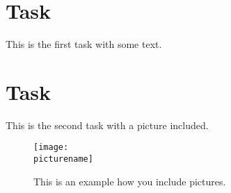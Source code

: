 \documentclass{article} %
\begin{document}
\section{Task}
This is the first task with some text.\\
\lipsum[1-2]

\section{Task}
This is the second task with a picture included.\\
\lipsum[2-3]
\begin{figure}[h]
    \centering
    \texttt{[image: \\picturename]}
    \caption{This is an example how you include pictures.}
    \label{fig:example}
\end{figure}
\end{document}
